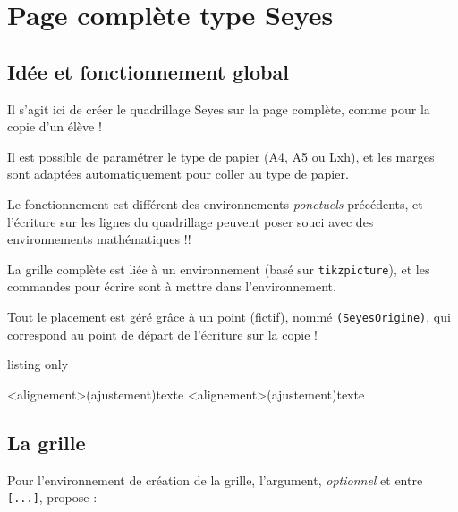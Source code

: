 \documentclass[a4paper]{article}
\begin{document}
\pagebreak

\section{Page complète type Seyes}

\subsection{Idée et fonctionnement global}

Il s'agit ici de créer le quadrillage Seyes sur la page complète, comme pour la copie d'un élève !

Il est possible de paramétrer le type de papier (A4, A5 ou Lxh), et les marges sont adaptées automatiquement pour coller au type de papier.

\smallskip

\faBomb{} Le fonctionnement est différent des environnements \textit{ponctuels} précédents, et l'écriture sur les lignes du quadrillage peuvent poser souci avec des environnements mathématiques !!

\medskip

La grille complète est liée à un environnement (basé sur \texttt{tikzpicture}), et les commandes pour écrire sont à mettre dans l'environnement.

\smallskip

Tout le placement est géré grâce à un point (fictif), nommé \texttt{(SeyesOrigine)}, qui correspond au point de départ de l'écriture sur la copie !

\begin{PresentationCode}{listing only}
\begin{PleinePageSeyes}[options]
	\LignePapierSeyes[options]<alignement>(ajustement){texte}
	\ParagraphePapierSeyes[options]<alignement>(ajustement){texte}
\end{PleinePageSeyes}
\end{PresentationCode}

\subsection{La grille}

Pour l'environnement de création de la grille, l'argument, \textit{optionnel} et entre \texttt{[...]}, propose :
\end{document}
